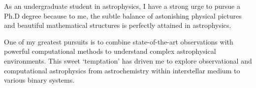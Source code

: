 \documentclass[11pt, a4paper]{awesome-cv} %
\begin{document}
\makecvheader %



\begin{cvletter}


As an undergraduate student in astrophysics, I have a strong urge to pursue a Ph.D degree  because to me, the subtle balance of astonishing physical pictures and beautiful mathematical structures is perfectly attained in astrophysics.

One of my greatest pursuits is to combine state-of-the-art observations with powerful computational methods to understand complex astrophysical environments. This sweet `temptation' has driven me to explore observational and computational astrophysics from astrochemistry within interstellar medium to various binary systems.




\end{cvletter}
\end{document}
